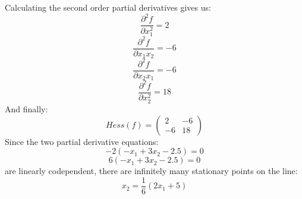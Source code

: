 \documentclass{article}
\begin{document}
Calculating the second order partial derivatives gives us:
\begin{equation*}
    \frac{\partial ^2 f}{\partial x_1^2} = 2
\end{equation*}
\begin{equation*}
    \frac{\partial ^2 f}{\partial x_1x_2} = -6
\end{equation*}
\begin{equation*}
    \frac{\partial ^2 f}{\partial x_2x_1} = -6
\end{equation*}
\begin{equation*}
    \frac{\partial ^2 f}{\partial x_2^2} = 18
\end{equation*}
And finally:
\begin{equation*}
    Hess(f) = \begin{pmatrix} 2 & -6 \\ -6 & 18 \end{pmatrix}
\end{equation*}
Since the two partial derivative equations:
\begin{equation*}
    -2(-x_1 + 3x_2 -2.5) = 0
\end{equation*}
\begin{equation*}
     6(-x_1 + 3x_2 -2.5) = 0
\end{equation*}
are linearly codependent, there are infinitely many stationary points on the line:
\begin{equation*}
    x_2 = \frac{1}{6}(2x_1 + 5)
\end{equation*}
\end{document}
